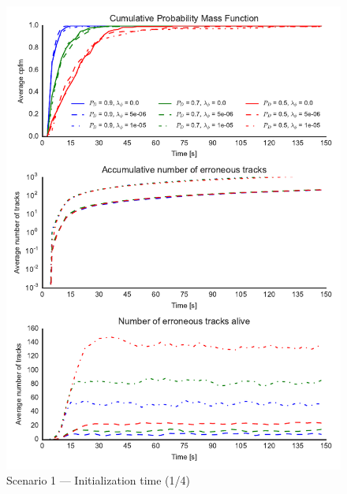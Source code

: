 \begin{figure}
\centering
\includegraphics{Figures/plots/Scenario1_Init-Time(1-4).pdf}
\caption{Scenario 1 --- Initialization time (1/4)}\label{fig:init1_time_1-4}
\end{figure}

